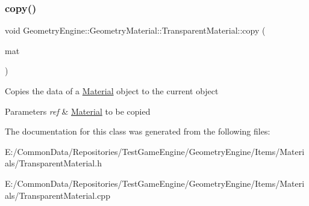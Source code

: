 \subsubsection{\texorpdfstring{copy()}{copy()}}
{\footnotesize\ttfamily void Geometry\+Engine\+::\+Geometry\+Material\+::\+Transparent\+Material\+::copy (\begin{DoxyParamCaption}\item[{const \mbox{\hyperlink{class_geometry_engine_1_1_geometry_material_1_1_transparent_material}{Transparent\+Material}} \&}]{mat }\end{DoxyParamCaption})\hspace{0.3cm}{\ttfamily [protected]}}

Copies the data of a \mbox{\hyperlink{class_geometry_engine_1_1_geometry_material_1_1_material}{Material}} object to the current object 
\begin{DoxyParams}{Parameters}
{\em ref} & \mbox{\hyperlink{class_geometry_engine_1_1_geometry_material_1_1_material}{Material}} to be copied \\
\hline
\end{DoxyParams}


The documentation for this class was generated from the following files\+:\begin{DoxyCompactItemize}
\item 
E\+:/\+Common\+Data/\+Repositories/\+Test\+Game\+Engine/\+Geometry\+Engine/\+Items/\+Materials/Transparent\+Material.\+h\item 
E\+:/\+Common\+Data/\+Repositories/\+Test\+Game\+Engine/\+Geometry\+Engine/\+Items/\+Materials/Transparent\+Material.\+cpp\end{DoxyCompactItemize}
